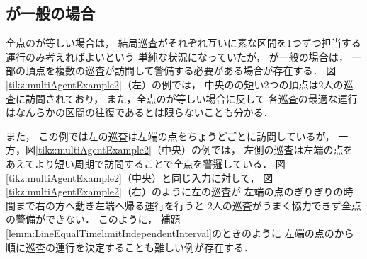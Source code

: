 
\subsection{{\maxIdletime}が一般の場合}
\label{subsec:LineDifferentTimelimit}

全点の{\maxIdletime}が等しい場合は，
結局巡査がそれぞれ互いに素な区間を1つずつ担当する運行のみ考えればよいという
単純な状況になっていたが，
{\maxIdletime}が一般の場合は，
一部の頂点を複数の巡査が訪問して警備する必要がある場合が存在する．
%
図\ref{tikz:multiAgentExample2}（左）の例では，
中央の{\maxIdletime}の短い2つの頂点は2人の巡査に訪問されており，
また，全点の{\maxIdletime}が等しい場合に反して
各巡査の最適な運行はなんらかの区間の往復であるとは限らないことも分かる．


また，
この例では左の巡査は左端の点を{\maxIdletime}ちょうどごとに訪問しているが，
一方，図\ref{tikz:multiAgentExample2}（中央）の例では，
左側の巡査は左端の点をあえてより短い周期で訪問することで全点を警邏している．
図\ref{tikz:multiAgentExample2}（中央）と同じ入力に対して，
図\ref{tikz:multiAgentExample2}（右）のように左の巡査が
左端の点の{\maxIdletime}ぎりぎりの時間まで右の方へ動き左端へ帰る運行を行うと
2人の巡査がうまく協力できず全点の警備ができない．
このように，
補題\ref{lemm:LineEqualTimelimitIndependentInterval}のときのように
左端の点の{\maxIdletime}から順に巡査の運行を決定することも難しい例が存在する．

